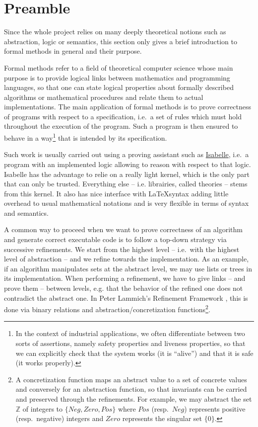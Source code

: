 \documentclass[12pt, a4 paper]{article}
\theoremstyle{definition}
\begin{document}
\section{Preamble}

Since the whole project relies on many deeply theoretical notions such as abstraction, logic or semantics, this section only gives a brief introduction to formal methods in general and their purpose.

\bigskip

Formal methods refer to a field of theoretical computer science whose main purpose is to provide logical links between mathematics and programming languages, so that one can state logical properties about formally described algorithms or mathematical procedures and relate them to actual implementations.
The main application of formal methods is to prove correctness of programs with respect to a specification, i.e.\ a set of rules which must hold throughout the execution of the program.
Such a program is then ensured to behave in a way\footnote{In the context of industrial applications, we often differentiate between two sorts of assertions, namely safety properties and liveness properties, so that we can explicitly check that the system works (it is ``alive'') and that it is safe (it works properly).} that is intended by its specification.

Such work is usually carried out using a proving assistant such as \href{https://isabelle.in.tum.de}{Isabelle}, i.e.\ a program with an implemented logic allowing to reason with respect to that logic.
Isabelle has the advantage to relie on a really light kernel, which is the only part that can only be trusted. Everything else -- i.e. librairies, called theories -- stems from this kernel.
It also has nice interface with \LaTeX syntax adding little overhead to usual mathematical notations and is very flexible in terms of syntax and semantics.

A common way to proceed when we want to prove correctness of an algorithm and generate correct executable code is to follow a top-down strategy via successive refinements.
We start from the highest level -- i.e.\ with the highest level of abstraction -- and we refine towards the implementation.
As an example, if an algorithm manipulates sets at the abstract level, we may use lists or trees in its implementation.
When performing a refinement, we have to give links -- and prove them -- between levels, e.g. that the behavior of the refined one does not contradict the abstract one.
In Peter Lammich's Refinement Framework \cite{lammich:ref}, this is done via binary relations and abstraction/concretization functions\footnote{A concretization function maps an abstract value to a set of concrete values and conversely for an abstraction function, so that invariants can be carried and preserved through the refinements.
For example, we may abstract the set $\mathbb{Z}$ of integers to $\{Neg, Zero, Pos\}$ where $Pos$ (resp.\ $Neg$) represents positive (resp.\ negative) integers and $Zero$ represents the singular set $\{0\}$.}.
\end{document}
